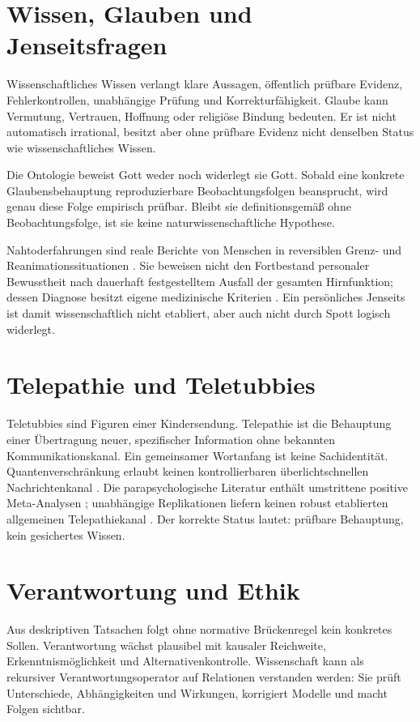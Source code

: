 \documentclass[11pt,a4paper]{scrartcl}
\begin{document}
\section{Wissen, Glauben und Jenseitsfragen}
Wissenschaftliches Wissen verlangt klare Aussagen, öffentlich prüfbare Evidenz,
Fehlerkontrollen, unabhängige Prüfung und Korrekturfähigkeit. Glaube kann Vermutung,
Vertrauen, Hoffnung oder religiöse Bindung bedeuten. Er ist nicht automatisch
irrational, besitzt aber ohne prüfbare Evidenz nicht denselben Status wie
wissenschaftliches Wissen.

Die Ontologie beweist Gott weder noch widerlegt sie Gott. Sobald eine konkrete
Glaubensbehauptung reproduzierbare Beobachtungsfolgen beansprucht, wird genau diese
Folge empirisch prüfbar. Bleibt sie definitionsgemäß ohne Beobachtungsfolge, ist sie
keine naturwissenschaftliche Hypothese.

Nahtoderfahrungen sind reale Berichte von Menschen in reversiblen Grenz- und
Reanimationssituationen \citep{Parnia2023}. Sie beweisen nicht den Fortbestand
personaler Bewusstheit nach dauerhaft festgestelltem Ausfall der gesamten Hirnfunktion;
dessen Diagnose besitzt eigene medizinische Kriterien
\citep{Greer2020,Greer2023}. Ein persönliches Jenseits ist damit wissenschaftlich
nicht etabliert, aber auch nicht durch Spott logisch widerlegt.

\section{Telepathie und Teletubbies}
Teletubbies sind Figuren einer Kindersendung. Telepathie ist die Behauptung einer
Übertragung neuer, spezifischer Information ohne bekannten Kommunikationskanal.
Ein gemeinsamer Wortanfang ist keine Sachidentität. Quantenverschränkung erlaubt
keinen kontrollierbaren überlichtschnellen Nachrichtenkanal
\citep{Ghirardi1982}. Die parapsychologische Literatur enthält umstrittene positive
Meta-Analysen \citep{TressoldiStorm2024}; unabhängige Replikationen liefern keinen
robust etablierten allgemeinen Telepathiekanal \citep{StedallTressoldi2025}.
Der korrekte Status lautet: prüfbare Behauptung, kein gesichertes Wissen.

\section{Verantwortung und Ethik}
Aus deskriptiven Tatsachen folgt ohne normative Brückenregel kein konkretes Sollen.
Verantwortung wächst plausibel mit kausaler Reichweite, Erkenntnismöglichkeit und
Alternativenkontrolle. Wissenschaft kann als rekursiver Verantwortungsoperator auf
Relationen verstanden werden: Sie prüft Unterschiede, Abhängigkeiten und Wirkungen,
korrigiert Modelle und macht Folgen sichtbar.
\end{document}
